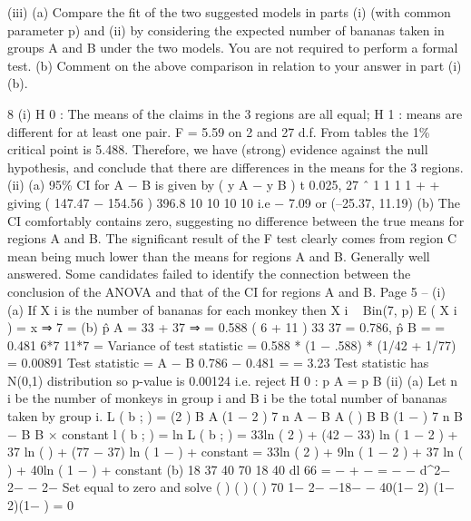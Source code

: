 \documentclass[a4paper,12pt]{article}
\begin{document}
\begin{enumerate}
(iii)
(a) Compare the fit of the two suggested models in parts (i) (with common
parameter p) and (ii) by considering the expected number of bananas
taken in groups A and B under the two models. You are not required
to perform a formal test.
(b) Comment on the above comparison in relation to your answer in
part (i)(b).

8
(i)
H 0 : The means of the claims in the 3 regions are all equal; H 1 : means are
different for at least one pair.
F = 5.59 on 2 and 27 d.f. From tables the 1\% critical point is 5.488.
Therefore, we have (strong) evidence against the null hypothesis, and
conclude that there are differences in the means for the 3 regions.
(ii)
(a)
95\% CI for \mu A − \mu B is given by
( y A − y B ) \pm t 0.025, 27 \sigma ˆ
1 1
1 1
+
+
giving ( 147.47 − 154.56 )  396.8
10 10
10 10
i.e − 7.09  or (–25.37, 11.19)
(b)
The CI comfortably contains zero, suggesting no difference between
the true means for regions A and B.
The significant result of the F test clearly comes from region C mean being much lower than the means for regions A and B.
Generally well answered. Some candidates failed to identify the connection between the conclusion of the ANOVA and that of the CI for regions A and B.
Page 5 – %
(i)
(a)
If X i is the number of bananas for each monkey then X i ~ Bin(7, p)
E ( X i ) = x ⇒ 7  =
(b)
p̂ A =
33 + 37
⇒  = 0.588
( 6 + 11 )
33
37
= 0.786, p̂ B =
= 0.481
6*7
11*7
 = Variance of test statistic = 0.588 * (1 − .588) * (1/42 + 1/77)
= 0.00891
Test statistic =
 A −  B 0.786 − 0.481
=
= 3.23
Test statistic has N(0,1) distribution so p-value is 0.00124
i.e. reject H 0 : p A = p B
(ii)
(a)
Let n i be the number of monkeys in group i and B i be the total number
of bananas taken by group i.
L ( b ; \theta ) = (2 \theta ) B A (1 − 2 \theta ) 7 n A − B A ( \theta ) B B (1 − \theta ) 7 n B − B B × constant
l ( b ; \theta ) = ln L ( b ; \theta )
= 33ln ( 2 \theta ) + (42 − 33) ln ( 1 − 2 \theta ) + 37 ln ( \theta ) + (77 − 37) ln ( 1 − \theta ) + constant
= 33ln ( 2 \theta ) + 9ln ( 1 − 2 \theta ) + 37 ln ( \theta ) + 40ln ( 1 − \theta ) + constant
(b)
18
37 40 70 18
40
dl 66
= −
+ −
= −
−
d\theta^2− 2\theta {}− \theta {}− 2− \theta
Set equal to zero and solve
(
) (
)
(
)
70 1− 2− \theta −18− \theta − 40\theta(1− 2\theta)
\theta(1− 2\theta)(1− \theta)
= 0

\end{enumerate}
\end{document}
